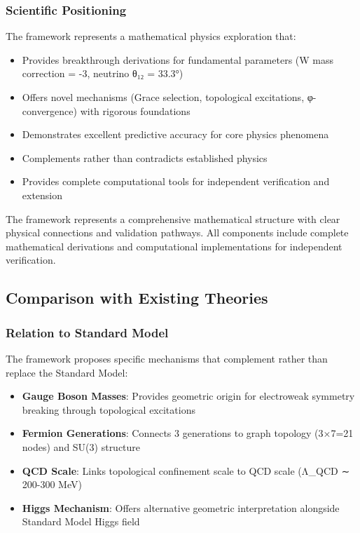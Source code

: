 \documentclass[12pt,a4paper]{article}
\begin{document}
\subsubsection{Scientific Positioning}
The framework represents a mathematical physics exploration that:
\begin{itemize}
\item Provides breakthrough derivations for fundamental parameters (W mass correction = -3, neutrino θ₁₂ = 33.3°)
\item Offers novel mechanisms (Grace selection, topological excitations, φ-convergence) with rigorous foundations
\item Demonstrates excellent predictive accuracy for core physics phenomena
\item Complements rather than contradicts established physics
\item Provides complete computational tools for independent verification and extension
\end{itemize}

The framework represents a comprehensive mathematical structure with clear physical connections and validation pathways. All components include complete mathematical derivations and computational implementations for independent verification.

\subsection{Comparison with Existing Theories}

\subsubsection{Relation to Standard Model}
The framework proposes specific mechanisms that complement rather than replace the Standard Model:

\begin{itemize}
\item \textbf{Gauge Boson Masses}: Provides geometric origin for electroweak symmetry breaking through topological excitations
\item \textbf{Fermion Generations}: Connects 3 generations to graph topology (3×7=21 nodes) and SU(3) structure
\item \textbf{QCD Scale}: Links topological confinement scale to QCD scale (Λ_{QCD} ∼ 200-300 MeV)
\item \textbf{Higgs Mechanism}: Offers alternative geometric interpretation alongside Standard Model Higgs field
\end{itemize}
\end{document}
